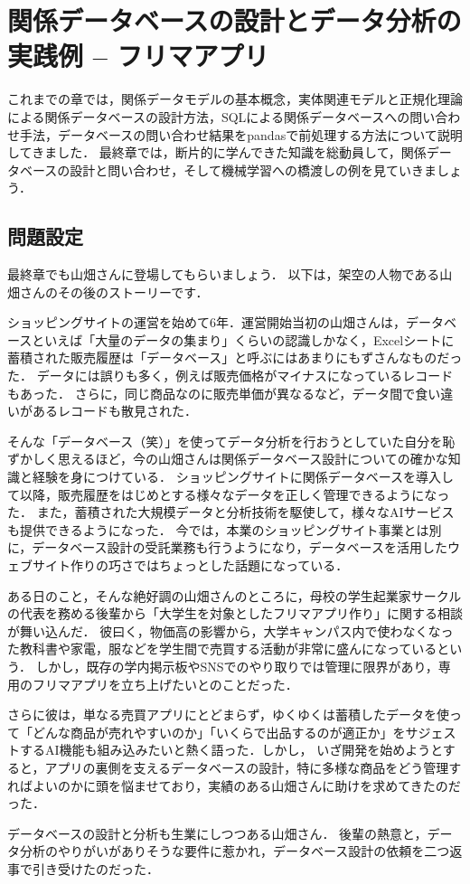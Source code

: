 \chapter{関係データベースの設計とデータ分析の実践例 -- フリマアプリ}
これまでの章では，関係データモデルの基本概念，実体関連モデルと正規化理論による関係データベースの設計方法，SQLによる関係データベースへの問い合わせ手法，データベースの問い合わせ結果をpandasで前処理する方法について説明してきました．
最終章では，断片的に学んできた知識を総動員して，関係データベースの設計と問い合わせ，そして機械学習への橋渡しの例を見ていきましょう．

\section{問題設定}
最終章でも山畑さんに登場してもらいましょう．
以下は，架空の人物である山畑さんのその後のストーリーです．

\begin{framed}
ショッピングサイトの運営を始めて6年．運営開始当初の山畑さんは，データベースといえば「大量のデータの集まり」くらいの認識しかなく，Excelシートに蓄積された販売履歴は「データベース」と呼ぶにはあまりにもずさんなものだった．
データには誤りも多く，例えば販売価格がマイナスになっているレコードもあった．
さらに，同じ商品なのに販売単価が異なるなど，データ間で食い違いがあるレコードも散見された．

そんな「データベース（笑）」を使ってデータ分析を行おうとしていた自分を恥ずかしく思えるほど，今の山畑さんは関係データベース設計についての確かな知識と経験を身につけている．
ショッピングサイトに関係データベースを導入して以降，販売履歴をはじめとする様々なデータを正しく管理できるようになった．
また，蓄積された大規模データと分析技術を駆使して，様々なAIサービスも提供できるようになった．
今では，本業のショッピングサイト事業とは別に，データベース設計の受託業務も行うようになり，データベースを活用したウェブサイト作りの巧さではちょっとした話題になっている．

ある日のこと，そんな絶好調の山畑さんのところに，母校の学生起業家サークルの代表を務める後輩から「大学生を対象としたフリマアプリ作り」に関する相談が舞い込んだ．
彼曰く，物価高の影響から，大学キャンパス内で使わなくなった教科書や家電，服などを学生間で売買する活動が非常に盛んになっているという．
しかし，既存の学内掲示板やSNSでのやり取りでは管理に限界があり，専用のフリマアプリを立ち上げたいとのことだった．

さらに彼は，単なる売買アプリにとどまらず，ゆくゆくは蓄積したデータを使って「どんな商品が売れやすいのか」「いくらで出品するのが適正か」をサジェストするAI機能も組み込みたいと熱く語った．しかし，
いざ開発を始めようとすると，アプリの裏側を支えるデータベースの設計，特に多様な商品をどう管理すればよいのかに頭を悩ませており，実績のある山畑さんに助けを求めてきたのだった．

データベースの設計と分析も生業にしつつある山畑さん．
後輩の熱意と，データ分析のやりがいがありそうな要件に惹かれ，データベース設計の依頼を二つ返事で引き受けたのだった．
\end{framed}

